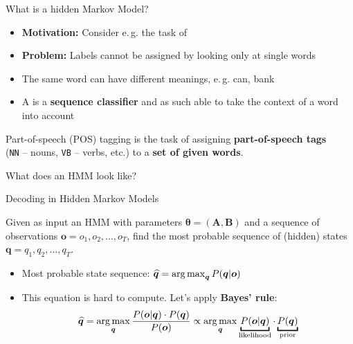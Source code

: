 \begin{frame}{What is a hidden Markov Model?}{}
	\begin{itemize}
		\item \textbf{Motivation:} Consider e.\,g. the task of 
		\item \textbf{Problem:} Labels cannot be assigned by looking only at single words
		\item {} The same word can have different meanings, e.\,g. can, bank
		\item A  is a \textbf{sequence classifier} and as such able to take the
			context of a word into account
	\end{itemize}

	\vspace*{3mm}
	\begin{boxBlueNoFrame}
		\footnotesize
		Part-of-speech (POS) tagging is the task of assigning \textbf{part-of-speech tags} \\
			(\texttt{NN} -- nouns, \texttt{VB} -- verbs, etc.) to a \textbf{set of given words}.
	\end{boxBlueNoFrame}
\end{frame}


\begin{frame}{What does an HMM look like?}{}
	
\end{frame}


\begin{frame}{Decoding in Hidden Markov Models}{}
	\begin{boxBlueNoFrame}
		 Given as input an HMM with parameters $\bm{\theta} = (\bm{A}, \bm{B})$ and a sequence of
		observations $\bm{o} = o_1, o_2, \dots, o_T$, find the most probable sequence of (hidden) states
		$\bm{q} = q_1, q_2, \dots, q_T$.
	\end{boxBlueNoFrame}

	\begin{itemize}
		\item Most probable state sequence: $\bm{\widehat{q}} = \operatorname*{arg\,max}_{\bm{q}} P(\bm{q} \vert \bm{o})$
		\item This equation is hard to compute. Let's apply \textbf{Bayes' rule}:
		\begin{equation}
			\bm{\widehat{q}} = \argmax_{\bm{q}} \frac{P(\bm{o} \vert \bm{q}) \cdot P(\bm{q})}{P(\bm{o})}
				\propto \argmax_{\bm{q}} \underbracket{P(\bm{o} \vert \bm{q})}_{\text{likelihood}} \cdot
				\underbracket{P(\bm{q})}_{\text{prior}}
		\end{equation}
	\end{itemize}
\end{frame}


